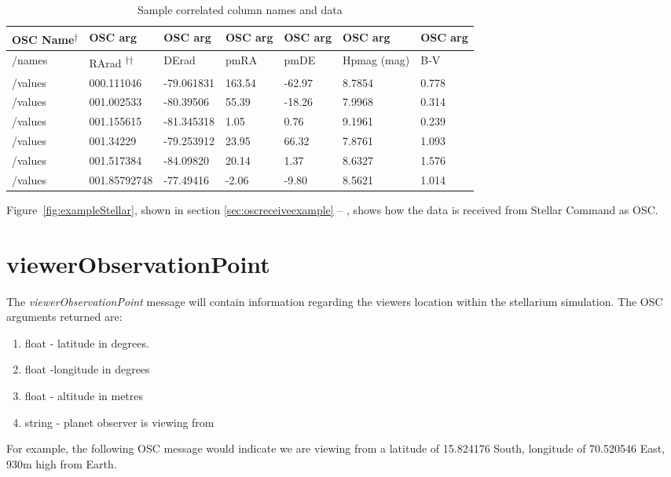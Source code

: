 \begin{table}
	\centering
	\caption{Sample correlated column names and data}
	\begin{tabular}{|l|l|l|l|l|l|l|}  \hline
		\textbf{OSC Name\textsuperscript{$\dagger$}}&\textbf{OSC arg}&\textbf{OSC arg}&\textbf{OSC arg}&\textbf{OSC arg}&\textbf{OSC arg}&\textbf{OSC arg} \\ \hline
		/names&RArad \textsuperscript{$\dagger$$\dagger$}&DErad &pmRA &pmDE &Hpmag (mag) &B-V\\ \hline
		/values&000.111046 &-79.061831 &163.54  & -62.97  &8.7854  &0.778\\ \hline
		/values&001.002533 &-80.39506  & 55.39  & -18.26  &7.9968  &0.314\\ \hline
		/values&001.155615 &-81.345318  &1.05     &0.76  &9.1961 & 0.239\\ \hline
		/values&001.34229  &-79.253912  & 23.95    &66.32  &7.8761  &1.093\\ \hline
		/values&001.517384 &-84.09820 &  20.14     &1.37  &8.6327  &1.576\\ \hline
		/values&001.85792748 &-77.49416  & -2.06    &-9.80  &8.5621  &1.014\\ \hline
		
		\hline\end{tabular}
	\label{tab:vizierData}
\end{table} 

Figure~\ref{fig:exampleStellar},  shown in  section \ref{sec:oscreceiveexample} --
\emph{}, shows how the data is received from Stellar Command as OSC.

\section{viewerObservationPoint}
The \textit{viewerObservationPoint} message will contain information regarding the viewers location within the stellarium simulation. The OSC arguments returned are:
\begin{enumerate}
	\item float - latitude in degrees. 
	\item float -longitude in degrees
	\item float - altitude in metres
	\item string - planet  observer is viewing from
\end{enumerate}

For example, the following OSC message would indicate we are viewing from a latitude of 15.824176 South, longitude of 70.520546 East, 930m high from Earth.


